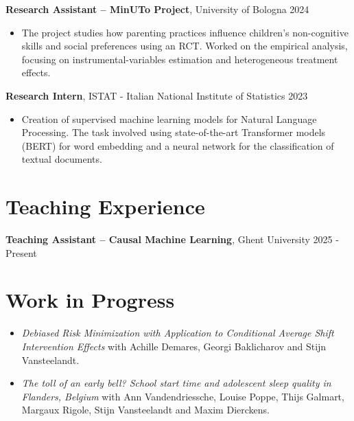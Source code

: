 \documentclass[11pt]{article}
\begin{document}
\vspace{0.1cm}

\textbf{Research Assistant – MinUTo Project}, University of Bologna \hfill 2024\\
\begin{itemize}
    \item The project studies how parenting practices influence children’s non-cognitive skills and social preferences using an RCT. Worked on the empirical analysis, focusing on instrumental-variables estimation and heterogeneous treatment effects.
\end{itemize}

\vspace{0.1cm}

\textbf{Research Intern}, ISTAT - Italian National Institute of Statistics  \hfill 2023\\
    \begin{itemize}
        \item Creation of supervised machine learning models for Natural Language Processing. The task involved using state-of-the-art Transformer models (BERT) for word embedding and a neural network for the classification of textual documents.
    \end{itemize}





\section*{Teaching Experience}
\textbf{Teaching Assistant – Causal Machine Learning}, Ghent University \hfill 2025 - Present\\





\section*{Work in Progress}
\begin{itemize}
    \item \textit{Debiased Risk Minimization with Application to Conditional Average Shift Intervention Effects} with Achille Demares, Georgi Baklicharov and Stijn Vansteelandt.
    \item \textit{The toll of an early bell? School start time and adolescent sleep quality in Flanders, Belgium} with Ann Vandendriessche, Louise Poppe, Thijs Galmart, Margaux Rigole, Stijn Vansteelandt and Maxim Dierckens.
\end{itemize}
 
\end{document}
